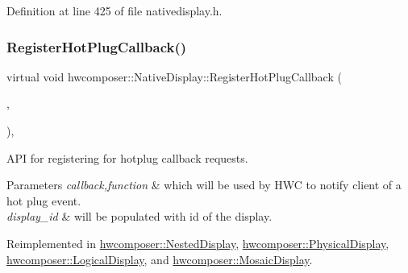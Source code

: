 Definition at line 425 of file nativedisplay.\+h.


\begin{DoxyCode}{0}
\end{DoxyCode}
\mbox{\label{classhwcomposer_1_1NativeDisplay_a4080879c203571d6404ba3b3aff53631}} 
\subsubsection{\texorpdfstring{Register\+Hot\+Plug\+Callback()}{RegisterHotPlugCallback()}}
{\footnotesize\ttfamily virtual void hwcomposer\+::\+Native\+Display\+::\+Register\+Hot\+Plug\+Callback (\begin{DoxyParamCaption}\item[{std\+::shared\+\_\+ptr$<$ \mbox{\hyperlink{classhwcomposer_1_1HotPlugCallback}{Hot\+Plug\+Callback}} $>$}]{,  }\item[{uint32\+\_\+t}]{ }\end{DoxyParamCaption})\hspace{0.3cm}{\ttfamily [inline]}, {\ttfamily [virtual]}}

A\+PI for registering for hotplug callback requests. 
\begin{DoxyParams}{Parameters}
{\em callback,function} & which will be used by H\+WC to notify client of a hot plug event. \\
\hline
{\em display\+\_\+id} & will be populated with id of the display. \\
\hline
\end{DoxyParams}


Reimplemented in \mbox{\hyperlink{classhwcomposer_1_1NestedDisplay_a0e9948e4763ef5abcdfcd12e42ef7267}{hwcomposer\+::\+Nested\+Display}}, \mbox{\hyperlink{classhwcomposer_1_1PhysicalDisplay_ac56013d7b3323ca84594779358aeb254}{hwcomposer\+::\+Physical\+Display}}, \mbox{\hyperlink{classhwcomposer_1_1LogicalDisplay_a04e78f9e54b66e91bab3f9744a2a18f3}{hwcomposer\+::\+Logical\+Display}}, and \mbox{\hyperlink{classhwcomposer_1_1MosaicDisplay_a1d4f419cda4d1729dfb085f385a76afb}{hwcomposer\+::\+Mosaic\+Display}}.



